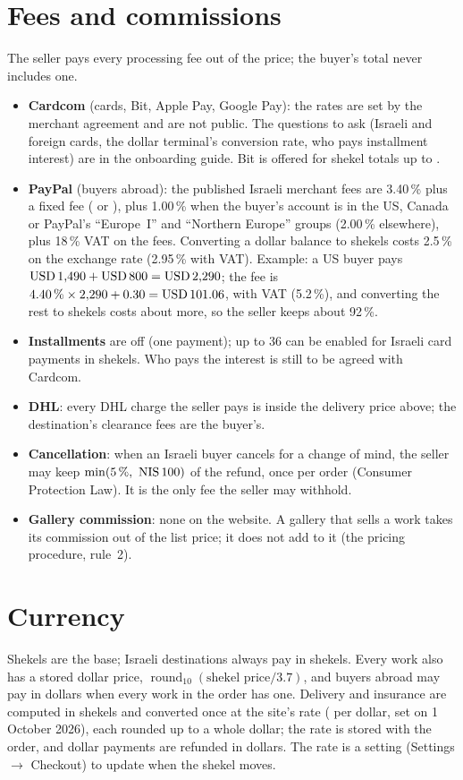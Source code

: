 \documentclass[11pt,a4paper]{article}
\newcommand{\nis}[1]{\text{NIS\,#1}}
\newcommand{\usd}[1]{\text{USD\,#1}}
\begin{document}
\section{Fees and commissions}
The seller pays every processing fee out of the price; the buyer's total never includes one.
\begin{itemize}
  \item \textbf{Cardcom} (cards, Bit, Apple Pay, Google Pay): the rates are set by the merchant
    agreement and are not public. The questions to ask (Israeli and foreign cards, the dollar
    terminal's conversion rate, who pays installment interest) are in the onboarding guide. Bit
    is offered for shekel totals up to \nis{5{,}000}.
  \item \textbf{PayPal} (buyers abroad): the published Israeli merchant fees \cite{paypal} are
    3.40\,\% plus a fixed fee (\usd{0.30} or \nis{1.20}), plus 1.00\,\% when the buyer's account is
    in the US, Canada or PayPal's ``Europe~I'' and ``Northern Europe'' groups (2.00\,\% elsewhere),
    plus 18\,\% VAT on the fees.
    Converting a dollar balance to shekels costs 2.5\,\% on the exchange rate (2.95\,\% with VAT).
    Example: a US buyer pays $\usd{1{,}490} + \usd{800} = \usd{2{,}290}$; the fee is
    $4.40\,\% \times 2{,}290 + 0.30 = \usd{101.06}$, \usd{119.25} with VAT (5.2\,\%), and
    converting the rest to shekels costs about \usd{64} more, so the seller keeps about 92\,\%.
  \item \textbf{Installments} are off (one payment); up to 36 can be enabled for Israeli card
    payments in shekels. Who pays the interest is still to be agreed with Cardcom.
  \item \textbf{DHL}: every DHL charge the seller pays is inside the delivery price above;
    the destination's clearance fees are the buyer's.
  \item \textbf{Cancellation}: when an Israeli buyer cancels for a change of mind, the seller may
    keep $\min(5\,\%,\ \nis{100})$ of the refund, once per order (Consumer Protection Law). It is
    the only fee the seller may withhold.
  \item \textbf{Gallery commission}: none on the website. A gallery that sells a work takes its
    commission out of the list price; it does not add to it (the pricing procedure, rule~2).
\end{itemize}

\section{Currency}
Shekels are the base; Israeli destinations always pay in shekels. Every work also has a stored
dollar price, $\operatorname{round}_{10}(\text{shekel price} / 3.7)$, and buyers abroad may pay in
dollars when every work in the order has one. Delivery and insurance are computed in shekels and
converted once at the site's rate (\nis{3.7} per dollar, set on 1 October 2026), each rounded up
to a whole dollar; the rate is stored with the order, and dollar payments are refunded in dollars.
The rate is a setting (Settings $\to$ Checkout) to update when the shekel moves.
\end{document}
